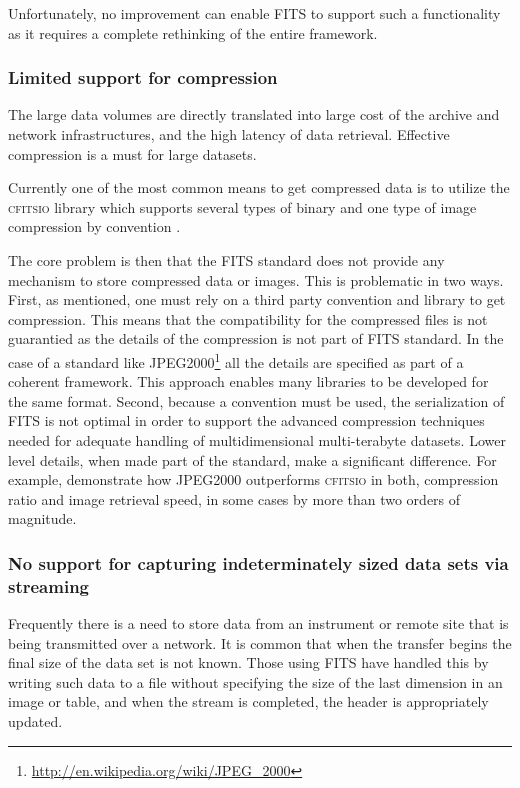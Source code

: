 \documentclass[final,authoryear,5p,times,twocolumn]{elsarticle}
\begin{document}
{{Unfortunately, no improvement can enable FITS to support
such a functionality as it requires a complete rethinking of the entire framework.

\subsubsection{Limited support for compression}

The large data volumes are directly translated into large cost of the archive and 
network infrastructures, and the high latency of data retrieval. Effective 
compression is a must for large datasets.

Currently one of the most common means to get compressed data is to utilize
the \textsc{cfitsio} library which supports several types of binary and one type of 
image compression by convention \citep[see
e.g.,][\href{http://ascl.net/1010.002}{ascl:1010.002}]{2000ASPC..216..551P, 
2007ASPC..376..483S,2009PASP..121..414P}.


The core problem is then that the FITS standard does not provide any mechanism 
to store compressed data or images.  This is problematic in two ways. First, 
as mentioned, one must rely on a third party convention and library to get compression.
This means that the compatibility for the 
compressed files is not guarantied as the details of the compression is not part of FITS
standard. In the case of a standard like JPEG2000\footnote{\href{http://en.wikipedia.org
/wiki/JPEG\_2000}{http://en.wikipedia.org/wiki/JPEG\_2000}}
all the details are specified as part of a coherent framework. This approach enables
many libraries to be developed for the same format.
Second, because a convention must be used, the serialization of FITS is not optimal 
in order to support the advanced 
compression techniques needed for adequate handling of multidimensional 
multi-terabyte datasets. Lower level details, when made part of the
standard, make a significant difference. For example, 
\citealt{2014Kitaeff} demonstrate 
how JPEG2000 outperforms \textsc{cfitsio} in both, compression ratio and 
image retrieval speed, in some cases by more than two orders of magnitude.


\subsubsection{No support for capturing indeterminately sized data sets via streaming}


Frequently there is a need to store data from an instrument or remote
site that is being transmitted over a network. It is common that when
the transfer begins the final size of the data set is not known. Those
using FITS have handled this by writing such data to a file without
specifying the size of the last dimension in an image or table, and
when the stream is completed, the header is appropriately updated.


}}
\end{document}
